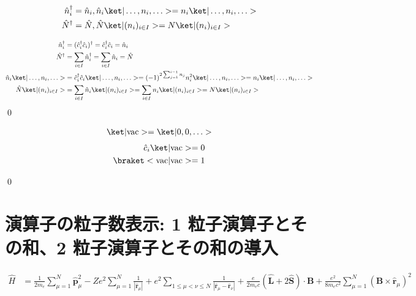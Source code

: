 \documentclass[uplatex,dvipdfmx,a4paper,11pt]{jlreq}
\makeatletter
\newcommand{\rr}{\bm{r}}
\newcommand{\pp}{\bm{p}}
\numberwithin{equation}{section}
\theoremstyle{definition}
\renewenvironment{proof}[1][\proofname]{\par
  \normalfont
  \topsep6\p@\@plus6\p@ \trivlist
  \item[\hskip\labelsep{\bfseries #1}\@addpunct{\bfseries}]\ignorespaces\quad\par
}{%
  \qed\endtrivlist\@endpefalse
}
\renewcommand\proofname{証明}
\makeatother
\begin{document}
\begin{proposition}
  \begin{align}
    \hat{n}_i^\dagger & = \hat{n}_i, \hat{n}_i\ket|\ldots,n_i,\ldots> = n_i\ket|\ldots,n_i,\ldots> \\
    \hat{N}^\dagger   & = \hat{N}, \hat{N}\ket|(n_i)_{i\in I}> = N\ket|(n_i)_{i\in I}>
  \end{align}
\end{proposition}
\begin{proof}
  \begin{align}
    \hat{n}_i^\dagger                & = (\hat{c}_i^\dagger\hat{c}_i)^\dagger = \hat{c}_i^\dagger\hat{c}_i = \hat{n}_i                                                            \\
    \hat{N}^\dagger                  & = \sum_{i\in I}\hat{n}_i^\dagger = \sum_{i\in I}\hat{n}_i = \hat{N}                                                                        \\
    \hat{n}_i\ket|\ldots,n_i,\ldots> & = \hat{c}_i^\dagger\hat{c}_i\ket|\ldots,n_i,\ldots> = (-1)^{2\sum_{j=1}^{i-1}n_j}n_i^2\ket|\ldots,n_i,\ldots> = n_i\ket|\ldots,n_i,\ldots> \\
    \hat{N}\ket|(n_i)_{i\in I}>      & = \sum_{i\in I}\hat{n}_i\ket|(n_i)_{i\in I}> = \sum_{i\in I}n_i\ket|(n_i)_{i\in I}> = N\ket|(n_i)_{i\in I}>
  \end{align}
\end{proof}

\begin{proposition}
  \begin{align}
    \ket|\mathrm{vac}> = \ket|0,0,\ldots>
  \end{align}
  \begin{align}
    \hat{c}_i\ket|\mathrm{vac}> = 0 \\
    \braket<\mathrm{vac}|\mathrm{vac}> = 1
  \end{align}
\end{proposition}
\begin{proof}

\end{proof}

\section{演算子の粒子数表示: 1 粒子演算子とその和、2 粒子演算子とその和の導入}
\begin{align}
  \hat{H} & = \frac{1}{2m_e}\sum_{\mu=1}^{N}\hat{\pp}_\mu^2 - Ze^2\sum_{\mu=1}^{N}\frac{1}{|\hat{\rr}_\mu|} + e^2\sum_{1\leq\mu<\nu\leq N}\frac{1}{|\hat{\rr}_\mu - \hat{\rr}_\nu|} + \frac{e}{2m_ec}(\hat{\bm{L}} + 2\hat{\bm{S}})\cdot\bm{B} + \frac{e^2}{8m_ec^2}\sum_{\mu=1}^{N}(\bm{B}\times\hat{\rr}_\mu)^2
\end{align}
\end{document}
